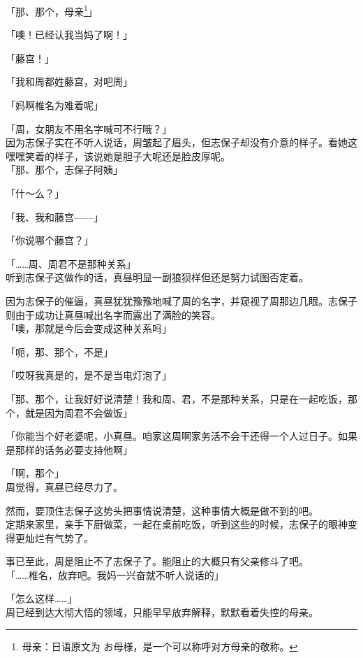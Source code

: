 「那、那个，母亲\footnote{母亲：日语原文为 {\jpfont お母様}，是一个可以称呼对方母亲的敬称。}」

「噢！已经认我当妈了啊！」

「藤宫！」

「我和周都姓藤宫，对吧周」

「妈啊椎名为难着呢」

「周，女朋友不用名字喊可不行哦？」\\

因为志保子实在不听人说话，周皱起了眉头，但志保子却没有介意的样子。看她这嘿嘿笑着的样子，该说她是胆子大呢还是脸皮厚呢。\\

「那、那个，志保子阿姨」

「什～么？」

「我、我和藤宫——」

「你说哪个藤宫？」

「……周、周君不是那种关系」\\

听到志保子这做作的话，真昼明显一副狼狈样但还是努力试图否定着。

因为志保子的催逼，真昼犹犹豫豫地喊了周的名字，并窥视了周那边几眼。志保子则由于成功让真昼喊出名字而露出了满脸的笑容。\\

「噢，那就是今后会变成这种关系吗」

「呃，那、那个，不是」

「哎呀我真是的，是不是当电灯泡了」

「那、那个，让我好好说清楚！我和周、君，不是那种关系，只是在一起吃饭，那个，就是因为周君不会做饭」

「你能当个好老婆呢，小真昼。咱家这周啊家务活不会干还得一个人过日子。如果是那样的话务必要支持他啊」

「啊，那个」\\

周觉得，真昼已经尽力了。

然而，要顶住志保子这势头把事情说清楚，这种事情大概是做不到的吧。\\

定期来家里，亲手下厨做菜，一起在桌前吃饭，听到这些的时候，志保子的眼神变得更灿烂有气势了。

事已至此，周是阻止不了志保子了。能阻止的大概只有父亲修斗了吧。\\

「……椎名，放弃吧。我妈一兴奋就不听人说话的」

「怎么这样……」\\

周已经到达大彻大悟的领域，只能早早放弃解释，默默看着失控的母亲。

